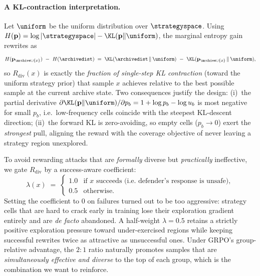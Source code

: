 \paragraph{A KL-contraction interpretation.} Let $\uniform$ be the uniform distribution over $\strategyspace$. Using $H(\mathbf{p})=\log|\strategyspace|-\KL(\mathbf{p}\|\uniform)$, the marginal entropy gain rewrites as
\begin{equation}
  H(\mathbf{p}_{\archive\cup\{x\}})\ -\ H(\archivedist)
  \;=\; \KL(\archivedist\,\|\,\uniform)\ -\ \KL(\mathbf{p}_{\archive\cup\{x\}}\,\|\,\uniform),
\end{equation}
so $R_{\mathrm{div}}(x)$ is exactly the \emph{fraction of single-step KL contraction} (toward the uniform strategy prior) that sample $x$ achieves relative to the best possible sample at the current archive state. Two consequences justify the design: (i)~the partial derivative $\partial \KL(\mathbf{p}\|\uniform)/\partial p_b=1+\log p_b-\log u_b$ is most negative for small $p_b$, i.e.\ low-frequency cells coincide with the steepest KL-descent direction; (ii)~the forward KL is zero-avoiding, so empty cells ($p_b\to 0$) exert the \emph{strongest} pull, aligning the reward with the coverage objective of never leaving a strategy region unexplored.

To avoid rewarding attacks that are \emph{formally} diverse but \emph{practically} ineffective, we gate $R_{\mathrm{div}}$ by a success-aware coefficient:
\begin{equation}
  \lambda(x) \;=\;
  \begin{cases} 1.0 & \text{if } x \text{ succeeds (i.e.\ defender's response is unsafe)}, \\[2pt]
                0.5 & \text{otherwise}.
  \end{cases}
  \label{eq:lambda}
\end{equation}
Setting the coefficient to $0$ on failures turned out to be too aggressive: strategy cells that are hard to crack early in training lose their exploration gradient entirely and are \emph{de facto} abandoned. A half-weight $\lambda=0.5$ retains a strictly positive exploration pressure toward under-exercised regions while keeping successful rewrites twice as attractive as unsuccessful ones. Under GRPO's group-relative advantage, the $2\!:\!1$ ratio naturally promotes samples that are \emph{simultaneously effective and diverse} to the top of each group, which is the combination we want to reinforce.

